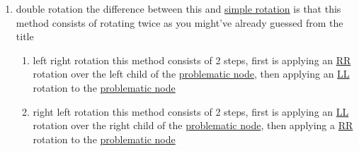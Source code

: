 \documentclass[a4paper,12pt]{article}
\begin{document}
\begin{enumerate}
\begin{enumerate}
\begin{my_example}
and so the original tree would become:\\[0pt]
\begin{center}

\end{center}\\[0pt]
\end{my_example}
\item right right rotation
\label{sec:orgae1b93d}
this is very similar to \hyperref[sec:orga4dd83f]{Left Left}, we first add the node and then if we have a \hyperref[sec:org634a573]{problematic node} \texttt{x} and if we took 2 steps to the right, then we use this rotation method\\[0pt]
this method consists of rotating the \hyperref[sec:orgaaf7b83]{subtree} \(T_x\) such that \texttt{x} becomes a left child of its original right child \texttt{z}, and \texttt{z} takes the place of \texttt{x} and the previous left child of \texttt{z} becomes a right child of \texttt{x} at its new position\\[0pt]

\url{./rightrightrotation.gif}\\[0pt]
image taken from \url{https://www.codesdope.com/course/data-structures-red-black-trees-insertion/}\\[0pt]
\end{enumerate}
\item double rotation
\label{sec:org251b5b5}
the difference between this and \hyperref[sec:orga681800]{simple rotation} is that this method consists of rotating twice as you might've already guessed from the title\\[0pt]
\begin{enumerate}
\item left right rotation
\label{sec:org9aa5be8}
this method consists of 2 steps, first is applying an \hyperref[sec:orgae1b93d]{RR} rotation over the left child of the \hyperref[sec:org634a573]{problematic node}, then applying an \hyperref[sec:orga4dd83f]{LL} rotation to the \hyperref[sec:org634a573]{problematic node}\\[0pt]
\item right left rotation
\label{sec:org56c5343}
this method consists of 2 steps, first is applying an \hyperref[sec:orga4dd83f]{LL} rotation over the right child of the \hyperref[sec:org634a573]{problematic node}, then applying a \hyperref[sec:orgae1b93d]{RR} rotation to the \hyperref[sec:org634a573]{problematic node}\\[0pt]
\end{enumerate}
\end{enumerate}
\end{document}
